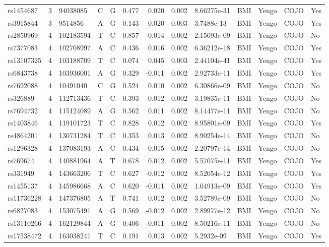 \documentclass[11pt,twoside]{bristolthesis}
\begin{document}
\begin{longtable}[t]{lrlllrrrlllll}
\addlinespace
rs1454687 & 3 & 94038085 & C & G & 0.477 & 0.020 & 0.002 & 8.66275e-31 & BMI & Yengo & COJO & Yes\\
rs3915844 & 3 & 9514856 & A & G & 0.143 & 0.020 & 0.003 & 3.7488e-13 & BMI & Yengo & COJO & Yes\\
rs2850969 & 4 & 102183594 & T & C & 0.857 & -0.014 & 0.002 & 2.15693e-09 & BMI & Yengo & COJO & No\\
rs7377083 & 4 & 102708997 & A & C & 0.436 & 0.016 & 0.002 & 6.36212e-18 & BMI & Yengo & COJO & Yes\\
rs13107325 & 4 & 103188709 & T & C & 0.074 & 0.045 & 0.003 & 2.44104e-41 & BMI & Yengo & COJO & Yes\\
\addlinespace
rs6843738 & 4 & 103936001 & A & G & 0.329 & -0.011 & 0.002 & 2.92733e-11 & BMI & Yengo & COJO & Yes\\
rs7692088 & 4 & 10491040 & C & G & 0.524 & 0.010 & 0.002 & 6.30866e-09 & BMI & Yengo & COJO & No\\
rs326889 & 4 & 112713436 & T & C & 0.393 & -0.012 & 0.002 & 3.19835e-11 & BMI & Yengo & COJO & No\\
rs7694732 & 4 & 115124089 & A & G & 0.562 & 0.011 & 0.002 & 8.14477e-11 & BMI & Yengo & COJO & No\\
rs1403846 & 4 & 119101723 & T & C & 0.828 & 0.012 & 0.002 & 8.95801e-09 & BMI & Yengo & COJO & Yes\\
\addlinespace
rs4864201 & 4 & 130731284 & T & C & 0.353 & 0.013 & 0.002 & 8.90254e-14 & BMI & Yengo & COJO & No\\
rs1296328 & 4 & 137083193 & A & C & 0.434 & 0.015 & 0.002 & 2.20797e-14 & BMI & Yengo & COJO & No\\
rs769674 & 4 & 140881964 & A & T & 0.678 & 0.012 & 0.002 & 5.57075e-11 & BMI & Yengo & COJO & Yes\\
rs331949 & 4 & 143663206 & T & C & 0.627 & -0.012 & 0.002 & 8.52054e-12 & BMI & Yengo & COJO & Yes\\
rs1455137 & 4 & 145986668 & A & C & 0.620 & -0.011 & 0.002 & 1.04913e-09 & BMI & Yengo & COJO & Yes\\
\addlinespace
rs11736228 & 4 & 147376805 & A & T & 0.741 & 0.012 & 0.002 & 3.52789e-09 & BMI & Yengo & COJO & No\\
rs6827083 & 4 & 153075491 & A & G & 0.569 & -0.012 & 0.002 & 2.89977e-12 & BMI & Yengo & COJO & No\\
rs13110266 & 4 & 162129844 & A & G & 0.406 & -0.011 & 0.002 & 8.50216e-11 & BMI & Yengo & COJO & No\\
rs17538472 & 4 & 163038241 & T & C & 0.191 & 0.013 & 0.002 & 5.2932e-09 & BMI & Yengo & COJO & Yes\\

\end{longtable}
\end{document}

